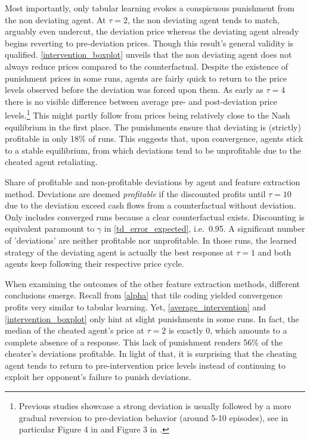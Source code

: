 Most importantly, only tabular learning evokes a conspicuous punishment from the non deviating agent. At $\tau = 2$, the non deviating agent tends to match, arguably even undercut, the deviation price whereas the deviating agent already begins reverting to pre-deviation prices. Though this result's general validity is qualified. \autoref{intervention_boxplot} unveils that the non deviating agent does not always reduce prices compared to the counterfactual. Despite the existence of punishment prices in some runs, agents are fairly quick to return to the price levels observed before the deviation was forced upon them. As early as $\tau = 4$ there is no visible difference between average pre- and post-deviation price levels.\footnote{Previous studies showcase a strong deviation is usually followed by a more gradual reversion to pre-deviation behavior (around 5-10 episodes), see in particular Figure 4 in \textcite{calvano_algorithmic_2018} and Figure 3 in \textcite{klein_autonomous_2019}.} This might partly follow from prices being relatively close to the Nash equilibrium in the first place. The punishments ensure that deviating is (strictly) profitable in only 18\% of runs. This suggests that, upon convergence, agents stick to a stable equilibrium, from which deviations tend to be unprofitable due to the cheated agent retaliating.

\begin{center}
	\begin{table}
		
		\caption[Share of profitable deviations]{Share of profitable and non-profitable deviations by agent and feature extraction method. Deviations are deemed \emph{profitable} if the discounted profits until $\tau = 10$ due to the deviation exceed cash flows from a counterfactual without deviation. Only includes converged runs because a clear counterfactual exists. Discounting is equivalent paramount to $\gamma$ in \autoref{td_error_expected}, i.e.\ 0.95. A significant number of 'deviations' are neither profitable nor unprofitable. In those runs, the learned strategy of the deviating agent is actually the best response at $\tau = 1$ and both agents keep following their respective price cycle.}
		\label{share_deviation_profitability}
	\end{table}
\end{center}

When examining the outcomes of the other feature extraction methods, different conclusions emerge. Recall from \autoref{alpha} that tile coding yielded convergence profits very similar to tabular learning. Yet, \autoref{average_intervention} and \autoref{intervention_boxplot} only hint at slight punishments in some runs. In fact, the median of the cheated agent's price at $\tau = 2$ is exactly 0, which amounts to a complete absence of a response. This lack of punishment renders 56\% of the cheater's deviations profitable. In light of that, it is surprising that the cheating agent tends to return to pre-intervention price levels instead of continuing to exploit her opponent's failure to punish deviations.

